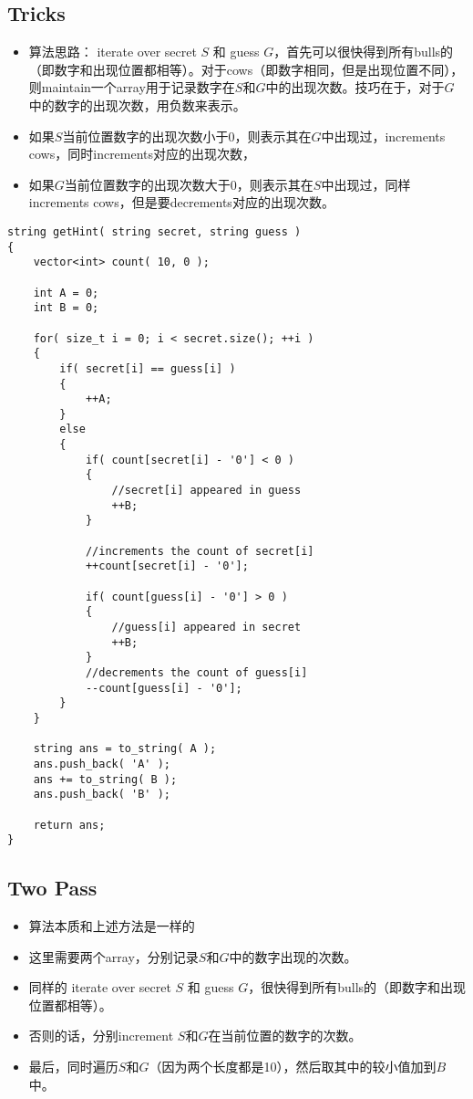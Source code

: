 \subsection{Tricks}
\begin{itemize}
\item 算法思路： iterate over secret $S$ 和 guess $G$，首先可以很快得到所有bulls的（即数字和出现位置都相等）。对于cows（即数字相同，但是出现位置不同），则maintain一个array用于记录数字在$S$和$G$中的出现次数。技巧在于，对于$G$中的数字的出现次数，用负数来表示。
\item 如果$S$当前位置数字的出现次数小于0，则表示其在$G$中出现过，increments cows，同时increments对应的出现次数，
\item 如果$G$当前位置数字的出现次数大于0，则表示其在$S$中出现过，同样increments cows，但是要decrements对应的出现次数。
\end{itemize}

\setcounter{lstlisting}{0}
\begin{lstlisting}[style=customc, caption={Counts}]
string getHint( string secret, string guess )
{
    vector<int> count( 10, 0 );

    int A = 0;
    int B = 0;

    for( size_t i = 0; i < secret.size(); ++i )
    {
        if( secret[i] == guess[i] )
        {
            ++A;
        }
        else
        {
            if( count[secret[i] - '0'] < 0 )
            {
                //secret[i] appeared in guess
                ++B;
            }

            //increments the count of secret[i]
            ++count[secret[i] - '0'];

            if( count[guess[i] - '0'] > 0 )
            {
                //guess[i] appeared in secret
                ++B;
            }
            //decrements the count of guess[i]
            --count[guess[i] - '0'];
        }
    }

    string ans = to_string( A );
    ans.push_back( 'A' );
    ans += to_string( B );
    ans.push_back( 'B' );

    return ans;
}
\end{lstlisting}
\subsection{Two Pass}
\begin{itemize}
\item 算法本质和上述方法是一样的
\item 这里需要两个array，分别记录$S$和$G$中的数字出现的次数。
\item 同样的 iterate over secret $S$ 和 guess $G$，很快得到所有bulls的（即数字和出现位置都相等）。
\item 否则的话，分别increment $S$和$G$在当前位置的数字的次数。
\item 最后，同时遍历$S$和$G$（因为两个长度都是10），然后取其中的较小值加到$B$中。
\end{itemize}

